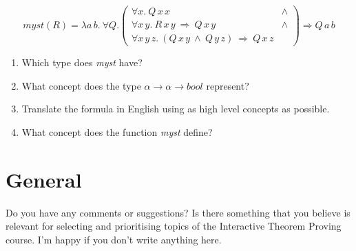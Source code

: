 \documentclass[a4paper,10pt,oneside]{scrartcl}
\begin{document}
\begin{enumerate}
\[
  \textit{myst}(\textit{R}) = \lambda a\, b.\ \forall Q. \left(
\begin{array}{cr}
      \forall x.\ Q\, x\, x\ & \wedge \\
      \forall x\,y.\ R\,x\,y\ \Longrightarrow\ Q\, x\, y\ & \wedge \\
      \forall x\,y\,z.\ (Q\,x\,y\ \wedge\  Q\,y\,z)\ \Longrightarrow\ Q\,x\,z 
\end{array}
\right)  \Longrightarrow Q\,a\,b
\] 
\begin{enumerate}
\item Which type does \textit{myst} have?
\item What concept does the type $\alpha \to \alpha \to \textit{bool}$ represent?
\item Translate the formula in English using as high level concepts as possible. 
\item What concept does the function \textit{myst} define?
\end{enumerate}
\end{enumerate}

\section{General}

Do you have any comments or suggestions? Is there something that you
believe is relevant for selecting and prioritising topics of the
Interactive Theorem Proving course. I'm happy if you don't write
anything here. 
\end{document}
